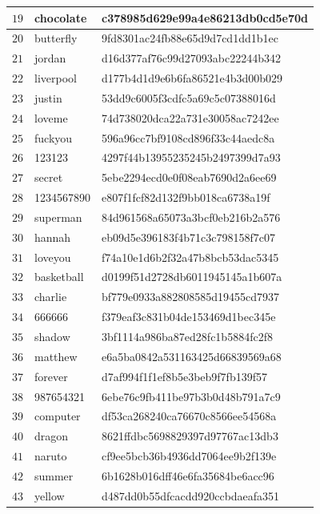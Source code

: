 \begin{longtable}{|l|l|l|}
    $19$ & chocolate & c378985d629e99a4e86213db0cd5e70d \\ \hline
    $20$ & butterfly & 9fd8301ac24fb88e65d9d7cd1dd1b1ec \\ \hline
    $21$ & jordan & d16d377af76c99d27093abc22244b342 \\ \hline
    $22$ & liverpool & d177b4d1d9e6b6fa86521e4b3d00b029 \\ \hline
    $23$ & justin & 53dd9c6005f3cdfc5a69c5c07388016d \\ \hline
    $24$ & loveme & 74d738020dca22a731e30058ac7242ee \\ \hline
    $25$ & fuckyou & 596a96cc7bf9108cd896f33c44aedc8a \\ \hline
    $26$ & 123123 & 4297f44b13955235245b2497399d7a93 \\ \hline
    $27$ & secret & 5ebe2294ecd0e0f08eab7690d2a6ee69 \\ \hline
    $28$ & 1234567890 & e807f1fcf82d132f9bb018ca6738a19f \\ \hline
    $29$ & superman & 84d961568a65073a3bcf0eb216b2a576 \\ \hline
    $30$ & hannah & eb09d5e396183f4b71c3c798158f7c07 \\ \hline
    $31$ & loveyou & f74a10e1d6b2f32a47b8bcb53dac5345 \\ \hline
    $32$ & basketball & d0199f51d2728db6011945145a1b607a \\ \hline
    $33$ & charlie & bf779e0933a882808585d19455cd7937 \\ \hline
    $34$ & 666666 & f379eaf3c831b04de153469d1bec345e \\ \hline
    $35$ & shadow & 3bf1114a986ba87ed28fc1b5884fc2f8 \\ \hline
    $36$ & matthew & e6a5ba0842a531163425d66839569a68 \\ \hline
    $37$ & forever & d7af994f1f1ef8b5e3beb9f7fb139f57 \\ \hline
    $38$ & 987654321 & 6ebe76c9fb411be97b3b0d48b791a7c9 \\ \hline
    $39$ & computer & df53ca268240ca76670c8566ee54568a \\ \hline
    $40$ & dragon & 8621ffdbc5698829397d97767ac13db3 \\ \hline
    $41$ & naruto & cf9ee5bcb36b4936dd7064ee9b2f139e \\ \hline
    $42$ & summer & 6b1628b016dff46e6fa35684be6acc96 \\ \hline
    $43$ & yellow & d487dd0b55dfcacdd920ccbdaeafa351 \\ \hline

\end{longtable}
